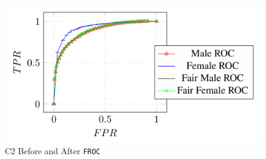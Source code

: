 \documentclass{article}
\newcommand{\ouralgo}{\texttt{FROC}}
\begin{document}
\begin{figure}
\begin{minipage}{0.3\linewidth}
    \caption{C3-Fair Fair vs. C3-\ouralgo}
    \label{fig:FairProj} 
     \end{minipage}
     \begin{minipage}{0.3\linewidth}
         \centering
         \includegraphics[scale = 0.3]{Images/roc_FROC.png}
   \caption{C2 Before and After \ouralgo}
    \label{fig:roc_froc}
     \end{minipage}
        \label{fig:three graphs}
\end{figure}


    
\end{document}
